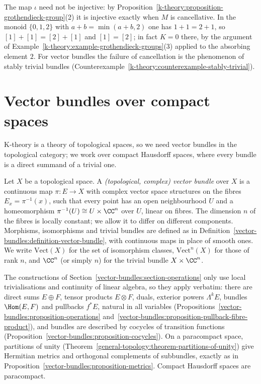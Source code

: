 \begin{counterexample}\label{k-theory:counterexample-not-injective}
The map $\iota$ need not be injective: by Proposition~\ref{k-theory:proposition-grothendieck-group}(2) it is injective exactly when $M$ is cancellative. In the monoid $\{0, 1, 2\}$ with
$a + b = \min(a + b, 2)$ one has $1 + 1 = 2 + 1$, so $[1] + [1] = [2] + [1]$ and $[1] = [2]$; in fact $K = 0$ there, by the argument of
Example~\ref{k-theory:example-grothendieck-groups}(3) applied to the absorbing element $2$. For vector bundles the failure of cancellation is the phenomenon of stably trivial bundles
(Counterexample~\ref{k-theory:counterexample-stably-trivial}).
\end{counterexample}

\section{Vector bundles over compact spaces}\label{k-theory:section-bundles}

K-theory is a theory of topological spaces, so we need vector bundles in the topological category; we work over compact Hausdorff spaces, where every bundle is a direct summand of a trivial one.

\begin{definition}\label{k-theory:definition-topological-bundle}
Let $X$ be a topological space. A \emph{(topological, complex) vector bundle} over $X$ is a continuous map $\pi \colon E \to X$ with complex vector space structures on the fibres $E_x = \pi^{-1}(x)$, such that
every point has an open neighbourhood $U$ and a homeomorphism $\pi^{-1}(U) \cong U \times \CC^n$ over $U$, linear on fibres. The dimension $n$ of the fibres is locally constant; we allow it to differ on
different components. Morphisms, isomorphisms and trivial bundles are defined as in Definition~\ref{vector-bundles:definition-vector-bundle}, with continuous maps in place of smooth ones. We write
$\mathrm{Vect}(X)$ for the set of isomorphism classes, $\mathrm{Vect}^n(X)$ for those of rank $n$, and $\CC^n$ (or simply $n$) for the trivial bundle $X \times \CC^n$.
\end{definition}

\begin{remark}\label{k-theory:remark-operations-topological}
The constructions of Section~\ref{vector-bundles:section-operations} only use local trivialisations and continuity of linear algebra, so they apply verbatim: there are direct sums
$E \oplus F$, tensor products $E \otimes F$, duals, exterior powers $\Lambda^kE$, bundles $\Hom(E, F)$ and pullbacks $f^*E$, natural in all variables
(Propositions~\ref{vector-bundles:proposition-operations} and~\ref{vector-bundles:proposition-pullback-fibre-product}), and bundles are described by cocycles of transition functions
(Proposition~\ref{vector-bundles:proposition-cocycles}). On a paracompact space, partitions of unity (Theorem~\ref{general-topology:theorem-partitions-of-unity}) give Hermitian metrics and
orthogonal complements of subbundles, exactly as in Proposition~\ref{vector-bundles:proposition-metrics}. Compact Hausdorff spaces are paracompact.
\end{remark}

